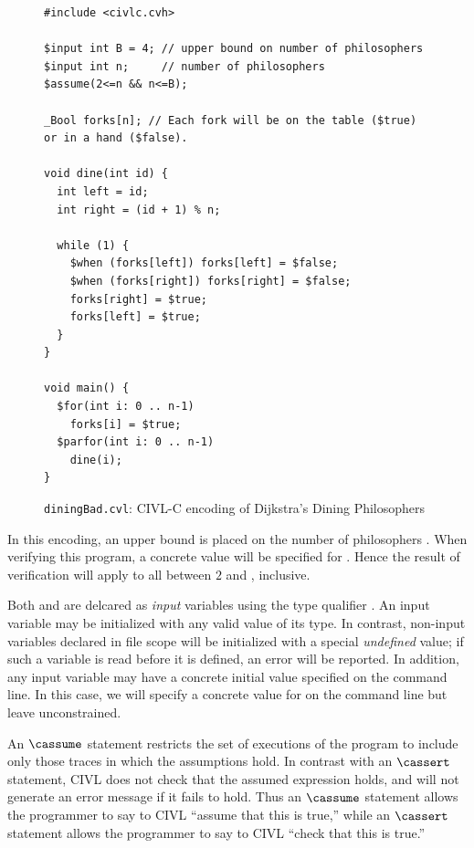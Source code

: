 \begin{figure}[t]
  \begin{small}
\begin{verbatim}
#include <civlc.cvh>

$input int B = 4; // upper bound on number of philosophers
$input int n;     // number of philosophers
$assume(2<=n && n<=B);

_Bool forks[n]; // Each fork will be on the table ($true) or in a hand ($false).

void dine(int id) {
  int left = id;
  int right = (id + 1) % n;

  while (1) {
    $when (forks[left]) forks[left] = $false;
    $when (forks[right]) forks[right] = $false;
    forks[right] = $true;
    forks[left] = $true;
  }
}

void main() { 
  $for(int i: 0 .. n-1)
    forks[i] = $true;
  $parfor(int i: 0 .. n-1)
    dine(i);
}
\end{verbatim}
  \end{small}
  \caption{\texttt{diningBad.cvl}: CIVL-C encoding of Dijkstra's Dining Philosophers}
  \label{fig:dining}
\end{figure}

In this encoding, an upper bound  is placed on the number of
philosophers .   When verifying this program, a concrete value
will be specified for .  Hence the result of verification will
apply to all  between $2$ and , inclusive.

Both  and  are delcared as \emph{input} variables using
the type qualifier \cinput.  An input variable may be
initialized with any valid value of its type.  In contrast, non-input
variables declared in file scope will be initialized with a
special \emph{undefined} value; if such a variable is read before it
is defined, an error will be reported. In addition, any input variable
may have a concrete initial value specified on the command line. In
this case, we will specify a concrete value for  on the command
line but leave  unconstrained.

An $\cassume$ statement restricts the set of executions of the program
to include only those traces in which the assumptions hold. In
contrast with an $\cassert$ statement, CIVL does not check that the
assumed expression holds, and will not generate an error message if it
fails to hold. Thus an $\cassume$ statement allows the programmer to
say to CIVL ``assume that this is true,'' while an $\cassert$
statement allows the programmer to say to CIVL ``check that this is
true.''

